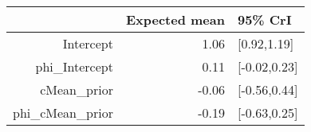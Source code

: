 \begin{tabular}{rrl}
  \hline
 & Expected mean & 95\% CrI \\ 
  \hline
Intercept & 1.06 & [0.92,1.19] \\ 
  phi\_Intercept & 0.11 & [-0.02,0.23] \\ 
  cMean\_prior & -0.06 & [-0.56,0.44] \\ 
  phi\_cMean\_prior & -0.19 & [-0.63,0.25] \\ 
   \hline
\end{tabular}

